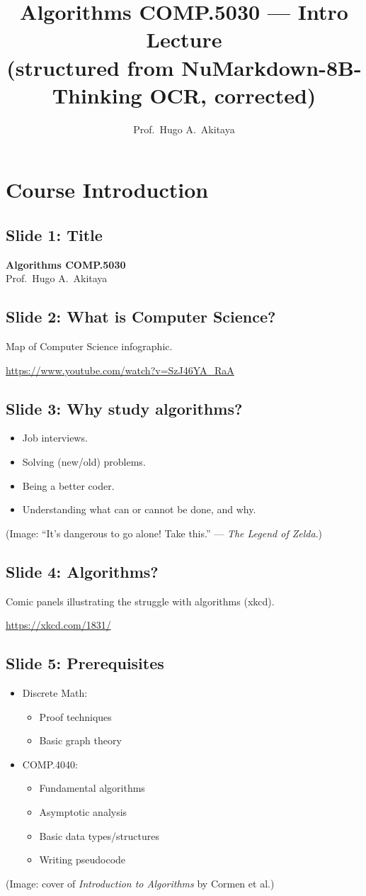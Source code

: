 \documentclass[11pt]{article}
\title{Algorithms COMP.5030 --- Intro Lecture\\[1ex]\large (structured from NuMarkdown-8B-Thinking OCR, corrected)}
\author{Prof.\ Hugo A.\ Akitaya}
\date{}
\newcommand{\slide}[2]{\subsection*{Slide #1: #2}}
\begin{document}
\maketitle

\section{Course Introduction}

\slide{1}{Title}
\begin{center}
\textbf{\Large Algorithms COMP.5030}\\[1ex]
Prof.\ Hugo A.\ Akitaya
\end{center}

\slide{2}{What is Computer Science?}
Map of Computer Science infographic.
\begin{center}
\url{https://www.youtube.com/watch?v=SzJ46YA_RaA}
\end{center}

\slide{3}{Why study algorithms?}
\begin{itemize}
  \item Job interviews.
  \item Solving (new/old) problems.
  \item Being a better coder.
  \item Understanding what can or cannot be done, and why.
\end{itemize}
(Image: ``It's dangerous to go alone! Take this.'' --- \textit{The Legend of Zelda}.)

\slide{4}{Algorithms?}
Comic panels illustrating the struggle with algorithms (xkcd).
\begin{center}
\url{https://xkcd.com/1831/}
\end{center}

\slide{5}{Prerequisites}
\begin{itemize}
  \item Discrete Math:
  \begin{itemize}
    \item Proof techniques
    \item Basic graph theory
  \end{itemize}
  \item COMP.4040:
  \begin{itemize}
    \item Fundamental algorithms
    \item Asymptotic analysis
    \item Basic data types/structures
    \item Writing pseudocode
  \end{itemize}
\end{itemize}
(Image: cover of \textit{Introduction to Algorithms} by Cormen et al.)
\end{document}
